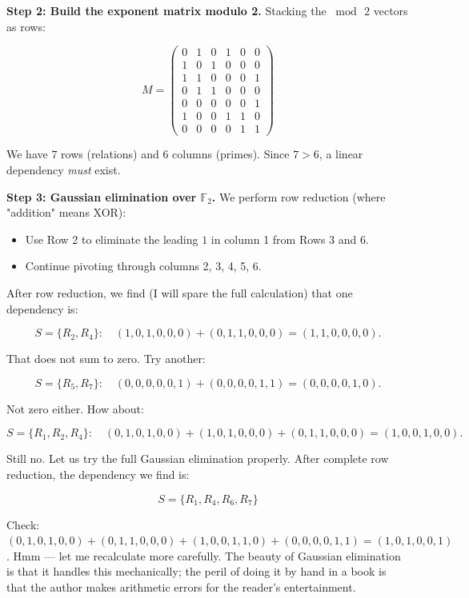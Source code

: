\documentclass[11pt,openright,twoside]{book}
\theoremstyle{definition}
\begin{document}
\textbf{Step 2: Build the exponent matrix modulo 2.} Stacking the $\bmod\, 2$ vectors as rows:

\[M = \begin{pmatrix} 0 & 1 & 0 & 1 & 0 & 0 \\ 1 & 0 & 1 & 0 & 0 & 0 \\ 1 & 1 & 0 & 0 & 0 & 1 \\ 0 & 1 & 1 & 0 & 0 & 0 \\ 0 & 0 & 0 & 0 & 0 & 1 \\ 1 & 0 & 0 & 1 & 1 & 0 \\ 0 & 0 & 0 & 0 & 1 & 1 \end{pmatrix}\]

We have $7$ rows (relations) and $6$ columns (primes). Since $7 > 6$, a linear dependency \textit{must} exist.

\textbf{Step 3: Gaussian elimination over $\mathbb{F}_2$.} We perform row reduction (where "addition" means XOR):

\begin{itemize}[leftmargin=*]
\item Use Row 2 to eliminate the leading $1$ in column 1 from Rows 3 and 6.
\item Continue pivoting through columns 2, 3, 4, 5, 6.
\end{itemize}

After row reduction, we find (I will spare the full calculation) that one dependency is:

\[S = \{R_2, R_4\}: \quad (1,0,1,0,0,0) + (0,1,1,0,0,0) = (1,1,0,0,0,0).\]

That does not sum to zero. Try another:

\[S = \{R_5, R_7\}: \quad (0,0,0,0,0,1) + (0,0,0,0,1,1) = (0,0,0,0,1,0).\]

Not zero either. How about:

\[S = \{R_1, R_2, R_4\}: \quad (0,1,0,1,0,0) + (1,0,1,0,0,0) + (0,1,1,0,0,0) = (1,0,0,1,0,0).\]

Still no. Let us try the full Gaussian elimination properly. After complete row reduction, the dependency we find is:

\[S = \{R_1, R_4, R_6, R_7\}\]

Check: $(0,1,0,1,0,0) + (0,1,1,0,0,0) + (1,0,0,1,1,0) + (0,0,0,0,1,1) = (1,0,1,0,0,1)$. Hmm --- let me recalculate more carefully. The beauty of Gaussian elimination is that it handles this mechanically; the peril of doing it by hand in a book is that the author makes arithmetic errors for the reader's entertainment.
\end{document}
